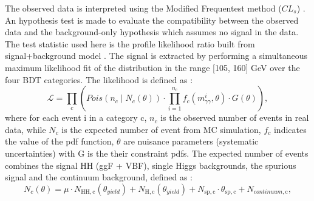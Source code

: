 The observed data is interpreted using the Modified Frequentest method ($CL_s$) \cite{CL_s}. An hypothesis test is made to evaluate the compatibility between the observed data and the background-only hypothesis which assumes no signal in the data. The test statistic used here is the profile likelihood ratio \cite{Z} built from signal+background model . The signal is extracted by performing a simultaneous maximum likelihood fit of the \myy distribution in the range [105, 160] GeV over the four BDT categories. The likelihood is defined as : 
\begin{equation}
    \mathcal{L}=\prod_{c}\left(Pois\left(n_{c}
    \mid N_{c}(\theta)\right) \cdot \prod_{i=1}^{n_{c}}
    f_{c}\left(m_{\gamma \gamma}^{i}, \theta\right) \cdot G(\theta)\right),
\end{equation}
where for each event i in a category c, $n_c$ is the observed number of events in real data, while $N_c$ is the expected number of event from MC simulation, 
$f_c$ indicates the value of the pdf function, $\theta$ are nuisance parameters (systematic uncertainties) with G is the their constraint pdfs. 
The expected number of events combines the signal HH (ggF + VBF), single Higgs backgrounds, the spurious signal and the continuum background, defined as : 
\begin{equation}
    N_{c}(\theta)=\mu \cdot N_{\mathrm{HH},
    \mathrm{c}}\left(\theta_{yield }\right)+N_{\mathrm{H},
    \mathrm{c}}\left(\theta_{yield }\right)+N_{\mathrm{sp},
    \mathrm{c}} \cdot \theta_{\mathrm{sp},
    \mathrm{c}}+N_{continuum , \mathrm{c}},
\end{equation}

